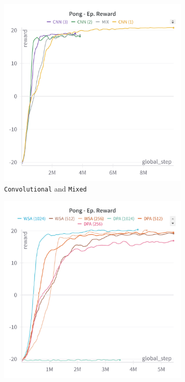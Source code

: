 \begin{figure}[ht]
\begin{subfigure}[b]{0.45\textwidth}
        \includegraphics[width=\textwidth]{images/pong_cnn_mixed.png}
        \caption{\texttt{Convolutional} and \texttt{Mixed}}
        \label{fig:pong_cnn_mixed}
    \end{subfigure}
    \hfill
    \begin{subfigure}[b]{0.45\textwidth}
        \centering
        \includegraphics[width=\textwidth]{images/pong_wsa_dpa.png}

\end{subfigure}
\end{figure}
